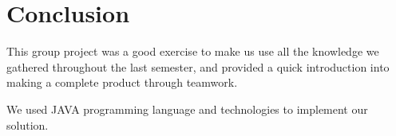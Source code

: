 \documentclass[10pt,a4paper]{report}
\begin{document}
\chapter{Conclusion}
This group project was a good exercise to make us use all the knowledge we gathered throughout the last semester, and provided a quick introduction into making a complete product through teamwork.

We used JAVA programming language and technologies to implement our solution.
\begin{flushleft}
	
	
\end{flushleft}
\end{document}
